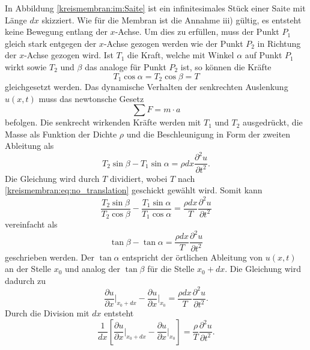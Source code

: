 In Abbildung \ref{kreismembran:im:Saite} ist ein infinitesimales Stück einer Saite mit Länge $ dx $ skizziert.
Wie für die Membran ist die Annahme iii) gültig, es entsteht keine Bewegung entlang der $ x $-Achse.
Um dies zu erfüllen, muss der Punkt $ P_1 $ gleich stark entgegen der $ x $-Achse gezogen werden wie der Punkt $ P_2 $ in Richtung der $ x $-Achse gezogen wird. 
Ist $ T_1 $ die Kraft, welche mit Winkel $ \alpha $ auf Punkt $ P_1 $ wirkt sowie $ T_2 $ und $ \beta$ das analoge für Punkt $ P_2 $ ist, so können die Kräfte 
\begin{equation}\label{kreismembran:eq:no_translation}
	T_1 \cos \alpha = T_2 \cos \beta = T
\end{equation}
gleichgesetzt werden. 
Das dynamische Verhalten der senkrechten Auslenkung $ u(x,t) $ muss das newtonsche Gesetz 
\begin{equation*}
	\sum F = m \cdot a
\end{equation*} 
befolgen. Die senkrecht wirkenden Kräfte werden mit $ T_1 $ und $ T_2 $ ausgedrückt, die Masse als Funktion der Dichte $ \rho $ und die Beschleunigung in Form der zweiten Ableitung als
\begin{equation*}
	T_2 \sin \beta - T_1 \sin \alpha = \rho dx \frac{\partial^2 u}{\partial t^2} .
\end{equation*}
Die Gleichung wird durch $ T $ dividiert, wobei $ T $ nach \ref{kreismembran:eq:no_translation} geschickt gewählt wird. Somit kann
\begin{equation*}
	\frac{T_2 \sin \beta}{T_2 \cos \beta} - \frac{T_1 \sin \alpha}{T_1 \cos \alpha} = \frac{\rho dx}{T} \frac{\partial^2 u}{\partial t^2}
\end{equation*}
vereinfacht als  
\begin{equation*}
	\tan \beta - \tan \alpha = \frac{\rho dx}{T} \frac{\partial^2 u}{\partial t^2}
\end{equation*}
geschrieben werden. 
Der $ \tan \alpha $ entspricht der örtlichen Ableitung von $ u(x,t) $ an der Stelle $ x_0 $ und analog der $ \tan \beta $ für die Stelle $ x_0 + dx $.
Die Gleichung wird dadurch zu
\begin{equation*}
	\frac{\partial u}{\partial x} \bigg|_{x_0 + dx} - \frac{\partial u}{\partial x} \bigg|_{x_0} = \frac{\rho dx}{T} \frac{\partial^2 u}{\partial t^2}.
\end{equation*} 
Durch die Division mit $ dx $ entsteht 
\begin{equation*}
	\frac{1}{dx} \left[\frac{\partial u}{\partial x} \bigg|_{x_0 + dx} - \frac{\partial u}{\partial x} \bigg|_{x_0}\right] = \frac{\rho}{T}\frac{\partial^2 u}{\partial t^2}.
\end{equation*}
